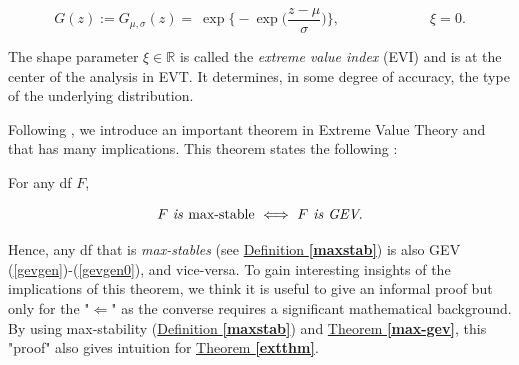 \begin{equation}\label{gevgen0}
G(z):=G_{\mu,\sigma}(z)=\ \exp \Bigg\{-\exp\bigg(\frac{z-\mu}{\sigma}\bigg)\Bigg\}, \qquad\qquad\qquad \ \ \xi=0.
\end{equation}

The shape parameter $\xi\in\mathbb{R}$ is called the \emph{extreme value index} (EVI) and is at the center of the analysis in EVT. It determines, in some degree of accuracy, the type of the underlying distribution. %

Following \cite{coles_introduction_2001}, we introduce an important theorem in Extreme Value Theory and that has many implications. This theorem states the following :

\begin{theorem}\label{max-gev} For any df $F$,
	
	\begin{equation}
	F \ \emph{\text{is \emph{max-stable}}}\ \Longleftrightarrow \ F \emph{\text{ is GEV}}.
	\end{equation}
\end{theorem}
Hence, any df that is \emph{max-stables} (see \hyperref[maxstab]{ Definition \textbf{\ref{maxstab}}}) is also GEV (\ref{gevgen})-(\ref{gevgen0}), and vice-versa. To gain interesting insights of the implications of this theorem, we think it is useful to give an informal proof but only for the "$\Leftarrow$" as the converse requires a significant mathematical background. By using max-stability (\hyperref[maxstab]{Definition \textbf{\ref{maxstab}}}) and \hyperref[max-gev]{Theorem \textbf{\ref{max-gev}}}, this "proof" also gives intuition for \hyperref[extthm]{Theorem \textbf{\ref{extthm}}}. 

